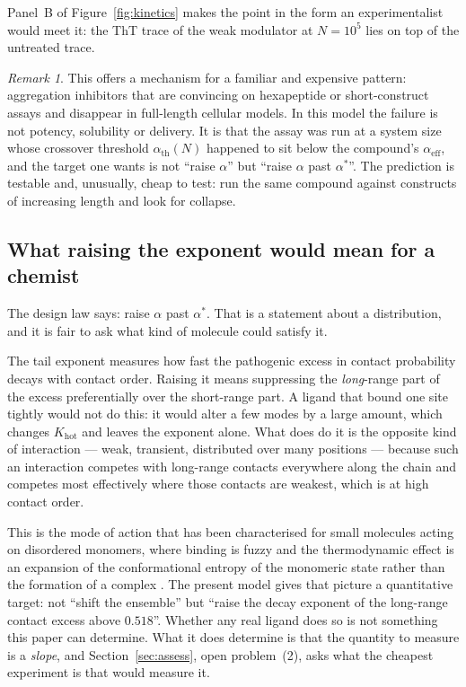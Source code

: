 \documentclass[11pt,reqno]{amsart}
\theoremstyle{plain}
\theoremstyle{definition}
\theoremstyle{remark}
\newtheorem{remark}[theorem]{Remark}
\numberwithin{equation}{section}
\newcommand{\Khot}{K_{\mathrm{hot}}}
\newcommand{\aeff}{\alpha_{\mathrm{eff}}}
\newcommand{\ath}{\alpha_{\mathrm{th}}}
\begin{document}
Panel~B of Figure~\ref{fig:kinetics} makes the point in the form an experimentalist would meet it: the ThT trace of the weak modulator at $N=10^5$ lies on top of the untreated trace.

\begin{remark}
This offers a mechanism for a familiar and expensive pattern: aggregation inhibitors that are convincing on hexapeptide or short-construct assays and disappear in full-length cellular models. In this model the failure is not potency, solubility or delivery. It is that the assay was run at a system size whose crossover threshold $\ath(N)$ happened to sit below the compound's $\aeff$, and the target one wants is not ``raise $\alpha$'' but ``raise $\alpha$ past $\alpha^\ast$''. The prediction is testable and, unusually, cheap to test: run the same compound against constructs of increasing length and look for collapse.
\end{remark}

\subsection{What raising the exponent would mean for a chemist}
\label{sec:chemist}
The design law says: raise $\alpha$ past $\alpha^\ast$. That is a statement about a distribution, and it is fair to ask what kind of molecule could satisfy it.

The tail exponent measures how fast the pathogenic excess in contact probability decays with contact order. Raising it means suppressing the \emph{long}-range part of the excess preferentially over the short-range part. A ligand that bound one site tightly would not do this: it would alter a few modes by a large amount, which changes $\Khot$ and leaves the exponent alone. What does do it is the opposite kind of interaction --- weak, transient, distributed over many positions --- because such an interaction competes with long-range contacts everywhere along the chain and competes most effectively where those contacts are weakest, which is at high contact order.

This is the mode of action that has been characterised for small molecules acting on disordered monomers, where binding is fuzzy and the thermodynamic effect is an expansion of the conformational entropy of the monomeric state rather than the formation of a complex \cite{Heller2020}. The present model gives that picture a quantitative target: not ``shift the ensemble'' but ``raise the decay exponent of the long-range contact excess above $0.518$''. Whether any real ligand does so is not something this paper can determine. What it does determine is that the quantity to measure is a \emph{slope}, and Section~\ref{sec:assess}, open problem~(2), asks what the cheapest experiment is that would measure it.
\end{document}
